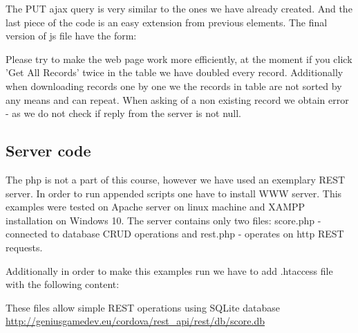 The PUT ajax query is very similar to the ones we have already created. And the last piece of the code is an easy extension from previous elements. The final version of js file have the form:




\begin{extercises}
  Please try to make the web page work more efficiently, at the moment if you click 'Get All Records' twice in the table we have doubled every record. Additionally when downloading records one by one we the records in table are not sorted by any means and can repeat.  When asking of a non existing record we obtain error -  as we do not check if reply from the server is not null.
\end{extercises}

 \subsection{Server code}
 The php is not a part of this course, however we have used an exemplary REST server. In order to run appended scripts one have to install WWW server. This examples were tested on Apache server on linux machine and XAMPP installation on Windows 10. The server contains only two files: score.php - connected to database CRUD operations and rest.php - operates on http REST requests.



 Additionally in order to make this examples run we have to add .htaccess file with the following content:


 These files allow simple REST operations using SQLite database \url{http://geniusgamedev.eu/cordova/rest_api/rest/db/score.db}



